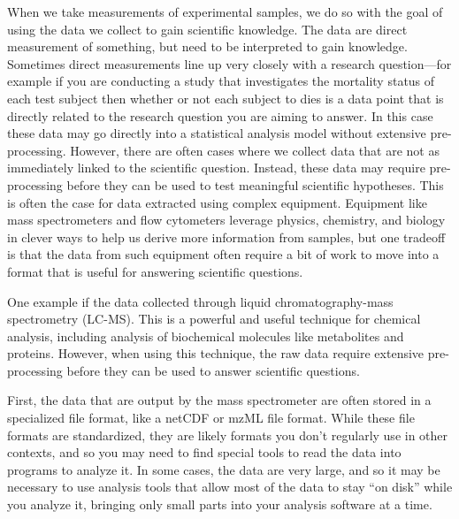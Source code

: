 \documentclass[]{tufte-book}
\begin{document}
When we take measurements of experimental samples, we do so with the goal of
using the data we collect to gain scientific knowledge. The data are direct
measurement of something, but need to be interpreted to gain knowledge.
Sometimes direct measurements line up very closely with a research
question---for example if you are conducting a study that investigates the
mortality status of each test subject then whether or not each subject to dies
is a data point that is directly related to the research question you are aiming
to answer. In this case these data may go directly into a statistical analysis
model without extensive pre-processing. However, there are often cases where we
collect data that are not as immediately linked to the scientific question.
Instead, these data may require pre-processing before they can be used to test
meaningful scientific hypotheses. This is often the case for data extracted
using complex equipment. Equipment like mass spectrometers and flow cytometers
leverage physics, chemistry, and biology in clever ways to help us derive more
information from samples, but one tradeoff is that the data from such equipment
often require a bit of work to move into a format that is useful for answering
scientific questions.

One example if the data collected through liquid chromatography-mass
spectrometry (LC-MS). This is a powerful and useful technique for chemical
analysis, including analysis of biochemical molecules like metabolites and
proteins. However, when using this technique, the raw data require extensive
pre-processing before they can be used to answer scientific questions.

First, the data that are output by the mass spectrometer are often stored in a
specialized file format, like a netCDF or mzML file format. While these file
formats are standardized, they are likely formats you don't regularly use in
other contexts, and so you may need to find special tools to read the data into
programs to analyze it. In some cases, the data are very large, and so it may be
necessary to use analysis tools that allow most of the data to stay ``on disk''
while you analyze it, bringing only small parts into your analysis software at a
time.
\end{document}

